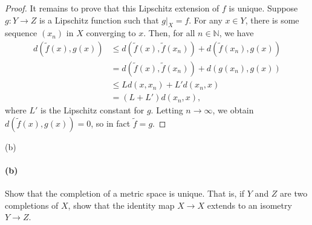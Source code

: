 \documentclass[12pt]{article}
\newlength{\myparskip}
\newenvironment{fullbox}{\begin{lrbox}{\savefullbox}\begin{minipage}{\dimexpr\textwidth-2\fboxsep\relax}\setlength{\parskip}{\myparskip}}{\end{minipage}\end{lrbox}\framebox[\textwidth]{\usebox{\savefullbox}}}
\newenvironment{pbox}[1][]{\begin{fullbox}\ifx#1\empty\else\paragraph{#1}\fi}{\end{fullbox}}
\newcommand{\N}{\mathbb{N}}
\newcommand{\<}{\langle}
\renewcommand{\>}{\rangle}
\begin{document}
\begin{proof}
    It remains to prove that this Lipschitz extension of $f$ is unique. Suppose $g : Y \to Z$ is a Lipschitz function such that $g|_X = f$. For any $x \in Y$, there is some sequence $(x_n)$ in $X$ converging to $x$. Then, for all $n \in \N$, we have
    \begin{align*}
        d(\tilde{f}(x), g(x))
            &\leq d(\tilde{f}(x), \tilde{f}(x_n)) + d(\tilde{f}(x_n), g(x)) \\
            &= d(\tilde{f}(x), \tilde{f}(x_n)) + d(g(x_n), g(x)) \\
            &\leq Ld(x, x_n) + L'd(x_n, x) \\
            &= (L + L')d(x_n, x),
    \end{align*}
    where $L'$ is the Lipschitz constant for $g$. Letting $n \to \infty$, we obtain $d(\tilde{f}(x), g(x)) = 0$, so in fact $\tilde{f} = g$.

\end{proof}

\begin{pbox}[(b)]
    Show that the completion of a metric space is unique.  That is, if $Y$
    and $Z$ are two completions of $X$, show that the identity map $X \to X$
    extends to an isometry $Y \to Z$.
\end{pbox}
\end{document}
